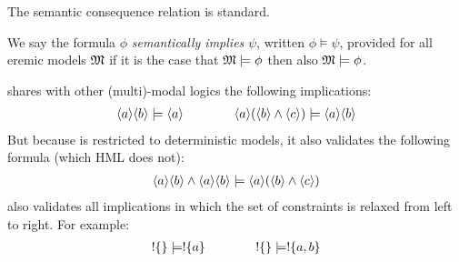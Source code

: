 \NI The semantic consequence relation is standard.

\begin{definition} 
 We say the formula $\phi$ \emph{semantically implies} $\psi$, written $\phi
   \models \psi$, provided for all eremic models $\frak{M}$ if it is the
   case that $\frak{M} \models \phi$ then also $\frak{M} \models \phi$.
\end{definition}

\begin{example}
\ELABR{} shares with other (multi)-modal logics the following
implications:
\begin{eqnarray*}
\langle a \rangle \langle b \rangle \models \langle a \rangle \qquad\qquad
\langle a \rangle (\langle b \rangle \land \langle c \rangle ) \models \langle a \rangle \langle b \rangle \end{eqnarray*}
But because \ELABR{} is restricted to deterministic models, it also validates the following formula (which HML does not):
\begin{eqnarray*}
\langle a \rangle \langle b \rangle \land \langle a \rangle \langle b \rangle \models \langle a \rangle (\langle b \rangle \land \langle c \rangle )
\end{eqnarray*}
\ELABR{} also validates all implications in which the set of constraints is relaxed from left to right. For example:
\begin{eqnarray*}
! \{\} \models ! \{a\} 
 \qquad\qquad
! \{\} \models ! \{a, b\} 
\end{eqnarray*}
\end{example}
